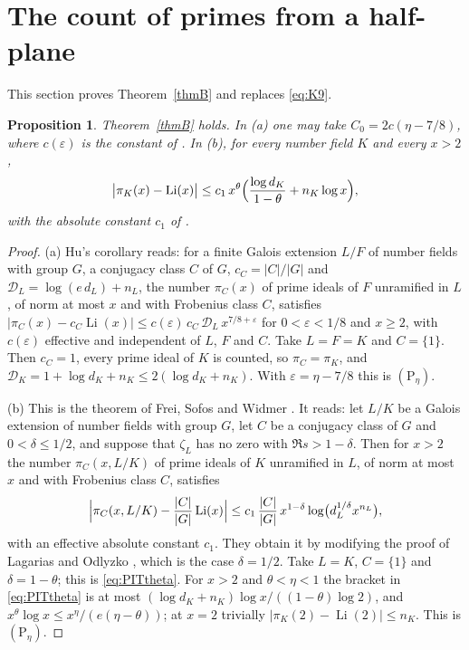 \documentclass[11pt]{amsart}
\newtheorem{proposition}[thm]{Proposition}
\theoremstyle{definition}
\theoremstyle{remark}
\newcommand{\Ph}[1]{(\mathrm P_{#1})}
\newcommand{\Li}{\operatorname{Li}}
\begin{document}
\section{The count of primes from a half-plane}\label{sec:count}
This section proves Theorem~\ref{thmB} and replaces \eqref{eq:K9}.

\begin{proposition}\label{prop:PIT}
Theorem~\ref{thmB} holds. In {\rm(a)} one may take $C_0=2c(\eta-7/8)$, where $c(\varepsilon)$ is the constant of \cite[Corollary~9.6]{Hu}. In {\rm(b)}, for every number field $K$ and every $x>2$,
\begin{equation}\label{eq:PITtheta}
 \bigl|\pi_K(x)-\Li(x)\bigr|\le c_1\,x^{\theta}\Bigl(\frac{\log d_K}{1-\theta}+n_K\log x\Bigr),
\end{equation}
with the absolute constant $c_1$ of \cite[Theorem~1.1]{FSW}.
\end{proposition}

\begin{proof}
(a) Hu's corollary reads: for a finite Galois extension $L/F$ of number fields with group $G$, a conjugacy class $C$ of $G$, $c_C=|C|/|G|$ and $\mathcal D_L=\log(e\,d_L)+n_L$, the number $\pi_C(x)$ of prime ideals of $F$ unramified in $L$, of norm at most $x$ and with Frobenius class $C$, satisfies $|\pi_C(x)-c_C\Li(x)|\le c(\varepsilon)\,c_C\,\mathcal D_L\,x^{7/8+\varepsilon}$ for $0<\varepsilon<1/8$ and $x\ge2$, with $c(\varepsilon)$ effective and independent of $L$, $F$ and $C$. Take $L=F=K$ and $C=\{1\}$. Then $c_C=1$, every prime ideal of $K$ is counted, so $\pi_C=\pi_K$, and $\mathcal D_K=1+\log d_K+n_K\le2(\log d_K+n_K)$. With $\varepsilon=\eta-7/8$ this is $\Ph\eta$.

(b) This is the theorem of Frei, Sofos and Widmer \cite[Theorem~1.1, p.~2]{FSW}. It reads: let $L/K$ be a Galois extension of number fields with group $G$, let $C$ be a conjugacy class of $G$ and $0<\delta\le1/2$, and suppose that $\zeta_L$ has no zero with $\Re s>1-\delta$. Then for $x>2$ the number $\pi_C(x,L/K)$ of prime ideals of $K$ unramified in $L$, of norm at most $x$ and with Frobenius class $C$, satisfies
\[
 \Bigl|\pi_C(x,L/K)-\frac{|C|}{|G|}\Li(x)\Bigr|\le c_1\,\frac{|C|}{|G|}\,x^{1-\delta}\log\bigl(d_L^{1/\delta}x^{n_L}\bigr),
\]
with an effective absolute constant $c_1$. They obtain it by modifying the proof of Lagarias and Odlyzko \cite{LO}, which is the case $\delta=1/2$. Take $L=K$, $C=\{1\}$ and $\delta=1-\theta$; this is \eqref{eq:PITtheta}. For $x>2$ and $\theta<\eta<1$ the bracket in \eqref{eq:PITtheta} is at most $(\log d_K+n_K)\log x/((1-\theta)\log2)$, and $x^\theta\log x\le x^\eta/(e(\eta-\theta))$; at $x=2$ trivially $|\pi_K(2)-\Li(2)|\le n_K$. This is $\Ph\eta$.
\end{proof}
\end{document}
